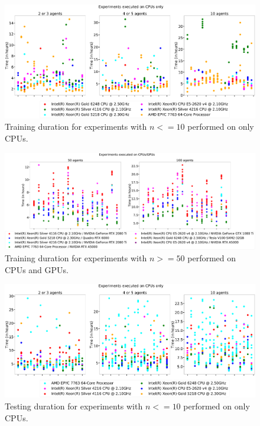 \begin{figure}
    \centering
    \includegraphics[width=\textwidth]{figures/ch5/training_time_cpu.pdf}
    \caption{Training duration for experiments with $n<=10$ performed on only CPUs.}
    \label{fig:training_time_cpu}
\end{figure}

\begin{figure}
    \centering
    \includegraphics[width=\textwidth]{figures/ch5/training_time_gpu.pdf}
    \caption{Training duration for experiments with $n>=50$ performed on CPUs and GPUs.}
    \label{fig:training_time_gpu}
\end{figure}

\begin{figure}
    \centering
    \includegraphics[width=\textwidth]{figures/ch5/testing_time_cpu.pdf}
    \caption{Testing duration for experiments with $n<=10$ performed on only CPUs.}
    \label{fig:testing_time_cpu}
\end{figure}

